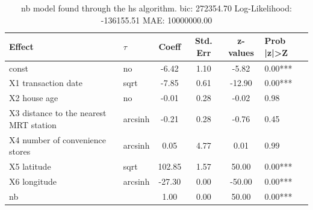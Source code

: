 \begin{table}
	\caption{nb model found through the hs algorithm. bic: 272354.70 Log-Likelihood: -136155.51 MAE: 10000000.00}
	\begin{center}
		\begin{tabular}{|l|l|c|c|c|l|}
			\hline
			Effect & $\tau$ & Coeff & Std. Err & z-values & Prob |z|>Z \\
			\hline
			const & no & -6.42 & 1.10 & -5.82 & 0.00*** \\
			\hline
			X1 transaction date & sqrt & -7.85 & 0.61 & -12.90 & 0.00*** \\
			\hline
			X2 house age & no & -0.01 & 0.28 & -0.02 & 0.98 \\
			\hline
			X3 distance to the nearest MRT station & arcsinh & -0.21 & 0.28 & -0.76 & 0.45 \\
			\hline
			X4 number of convenience stores & arcsinh & 0.05 & 4.77 & 0.01 & 0.99 \\
			\hline
			X5 latitude & sqrt & 102.85 & 1.57 & 50.00 & 0.00*** \\
			\hline
			X6 longitude & arcsinh & -27.30 & 0.00 & -50.00 & 0.00*** \\
			\hline
			nb &  & 1.00 & 0.00 & 50.00 & 0.00*** \\
			\hline
		\end{tabular}
	\end{center}
\end{table}